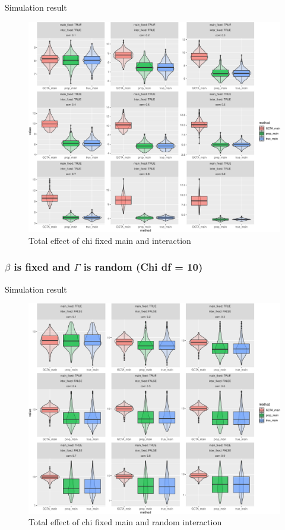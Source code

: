 \documentclass[]{article}
\begin{document}
Simulation result

\begin{figure}
\centering
\includegraphics{Simulation_report_files/figure-latex/main_fixed_fixed_chi_combine_df_10-1.pdf}
\caption{Total effect of chi fixed main and interaction}
\end{figure}

\clearpage

\subsubsection{\texorpdfstring{\(\beta\) is fixed and \(\Gamma\) is
random (Chi df =
10)}{\textbackslash{}beta is fixed and \textbackslash{}Gamma is random (Chi df = 10)}}\label{beta-is-fixed-and-gamma-is-random-chi-df-10}

Simulation result

\begin{figure}
\centering
\includegraphics{Simulation_report_files/figure-latex/main_fixed_random_chi_combine_df_10-1.pdf}
\caption{Total effect of chi fixed main and random interaction}
\end{figure}
\end{document}
